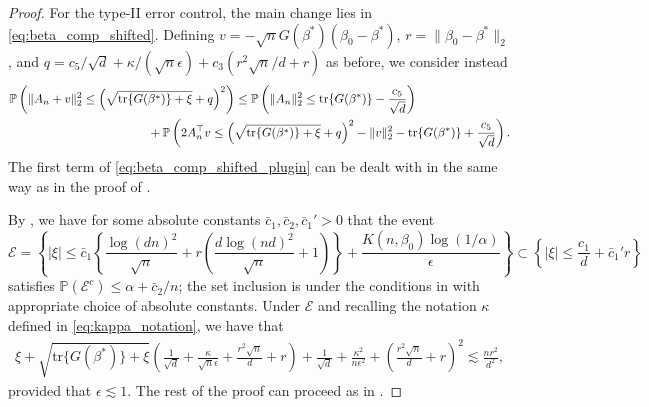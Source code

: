 \documentclass[11pt]{article}
\begin{document}
\begin{proof}
For the type-II error control, the main change lies in 
\eqref{eq:beta_comp_shifted}. Defining $v= -\sqrt{n}G(\beta^*)(\beta_0 - \beta^*)$, $r=\|\beta_0-\beta^*\|_2$, and $q= c_5/\sqrt{d} + \kappa/(\sqrt{n} \epsilon)+ c_3\left(r^2 \sqrt{n} /d + r \right)$ as before, we consider instead 
\begin{align}
    &\mathbb{P}\left(\|A_n+v\|^2_2 \leq \left(\sqrt{\mathrm{tr}\{G(\beta^*)\} + \xi} +q \right)^2 \right) \leq \mathbb{P}\left(\|A_n\|^2_2 \leq \mathrm{tr}\{G(\beta^*)\} - \frac{c_5}{\sqrt{d}} \right) \notag\\
    &\hspace{4cm}+ \mathbb{P} \left( 2A_n^\top v \leq \left(\sqrt{\mathrm{tr}\{G(\beta^*)\} + \xi} + q \right)^2 - \|v\|_2^2 -  \mathrm{tr}\{G(\beta^*)\} + \frac{c_5}{\sqrt{d}} \right).
    \label{eq:beta_comp_shifted_plugin}
\end{align}
The first term of \eqref{eq:beta_comp_shifted_plugin} can be dealt with in the same way as in the proof of . 

By , we have for some absolute constants $\bar{c}_1, \bar{c}_2, \bar{c}_1'>0$ that the event
\begin{equation*}
    \mathcal{E} = \left\{ |\xi| \leq \bar{c}_1 \left \{  \frac{\log(dn)^2}{\sqrt{n}} + r \left( \frac{d\log(nd)^2}{\sqrt{n}} + 1 \right) \right\} + \frac{K(n, \beta_0)\log(1/\alpha)}{\epsilon} \right\} \subset \left\{ |\xi| \leq \frac{c_1}{d} + \bar{c}_1' r\right\}
\end{equation*}
satisfies $\mathbb{P}(\mathcal{E}^c) \leq \alpha + \bar{c}_2/n$; the set inclusion is under the conditions in  with appropriate choice of absolute constants. Under $\mathcal{E}$ and recalling the notation $\kappa$ defined in \eqref{eq:kappa_notation}, we have that 
\begin{align*}
\xi + \sqrt{\mathrm{tr}\{G(\beta^*)\} + \xi} \left(\frac{1}{\sqrt{d}} +\frac{\kappa}{\sqrt{n} \epsilon} +  \frac{r^2 \sqrt{n}}{d} + r \right) +  \frac{1}{\sqrt{d}} +  \frac{\kappa^2}{n \epsilon^2} + \left(\frac{r^2\sqrt{n}}{d} + r \right)^2 \lesssim\frac{nr^2}{d^2},
\end{align*}
provided that $\epsilon \lesssim 1$.
The rest of the proof can proceed as in . 
\end{proof}
\end{document}
